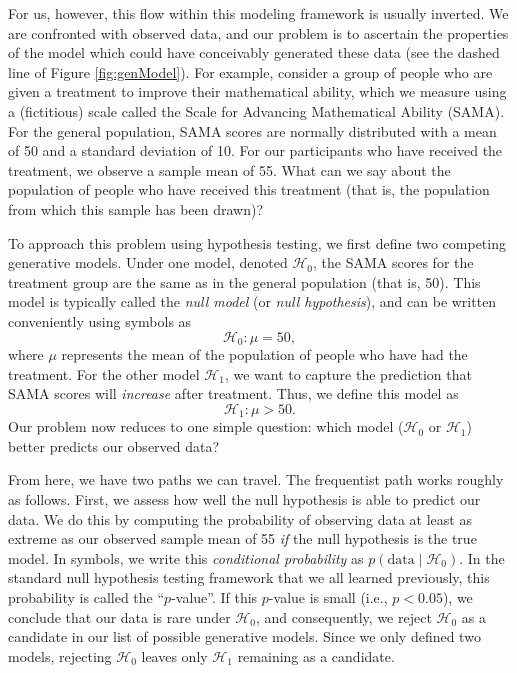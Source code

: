 \documentclass[english,,doc,floatsintext]{apa6}
\begin{document}
For us, however, this flow within this modeling framework is usually inverted. We are confronted with observed data, and our problem is to ascertain the properties of the model which could have conceivably generated these data (see the dashed line of Figure \ref{fig:genModel}). For example, consider a group of people who are given a treatment to improve their mathematical ability, which we measure using a (fictitious) scale called the Scale for Advancing Mathematical Ability (SAMA). For the general population, SAMA scores are normally distributed with a mean of 50 and a standard deviation of 10. For our participants who have received the treatment, we observe a sample mean of 55. What can we say about the population of people who have received this treatment (that is, the population from which this sample has been drawn)?

To approach this problem using hypothesis testing, we first define two competing generative models. Under one model, denoted \(\mathcal{H}_0\), the SAMA scores for the treatment group are the same as in the general population (that is, 50). This model is typically called the \emph{null model} (or \emph{null hypothesis}), and can be written conveniently using symbols as
\[
\mathcal{H}_0:\mu=50,
\]
where \(\mu\) represents the mean of the population of people who have had the treatment. For the other model \(\mathcal{H}_1\), we want to capture the prediction that SAMA scores will \emph{increase} after treatment. Thus, we define this model as
\[
\mathcal{H}_1:\mu >50.
\]
Our problem now reduces to one simple question: which model (\(\mathcal{H}_0\) or \(\mathcal{H}_1\)) better predicts our observed data?

From here, we have two paths we can travel. The frequentist path works roughly as follows. First, we assess how well the null hypothesis is able to predict our data. We do this by computing the probability of observing data at least as extreme as our observed sample mean of 55 \emph{if} the null hypothesis is the true model. In symbols, we write this \emph{conditional probability} as \(p(\text{data}\mid \mathcal{H}_0)\). In the standard null hypothesis testing framework that we all learned previously, this probability is called the \enquote{\(p\)-value}. If this \(p\)-value is small (i.e., \(p<0.05\)), we conclude that our data is rare under \(\mathcal{H}_0\), and consequently, we reject \(\mathcal{H}_0\) as a candidate in our list of possible generative models. Since we only defined two models, rejecting \(\mathcal{H}_0\) leaves only \(\mathcal{H}_1\) remaining as a candidate.
\end{document}
